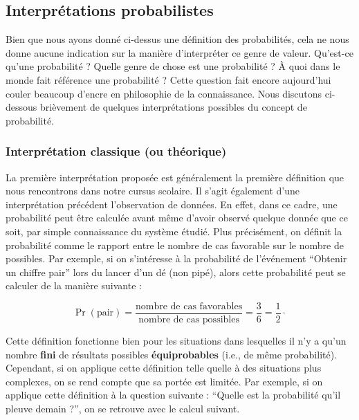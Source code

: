 \documentclass[
  a4paper,11pt,twoside,onecolumn,openright,final,oldfontcommands]{memoir}
\theoremstyle{definition}
\theoremstyle{definition}
\theoremstyle{definition}
\theoremstyle{remark}
\begin{document}
\hypertarget{interpruxe9tations-probabilistes}{%
\subsection{Interprétations probabilistes}\label{interpruxe9tations-probabilistes}}

Bien que nous ayons donné ci-dessus une définition des probabilités, cela ne nous donne aucune indication sur la manière d'interpréter ce genre de valeur. Qu'est-ce qu'une probabilité ? Quelle genre de chose est une probabilité ? À quoi dans le monde fait référence une probabilité ? Cette question fait encore aujourd'hui couler beaucoup d'encre en philosophie de la connaissance. Nous discutons ci-dessous brièvement de quelques interprétations possibles du concept de probabilité.

\hypertarget{interpruxe9tation-classique-ou-thuxe9orique}{%
\subsubsection{Interprétation classique (ou théorique)}\label{interpruxe9tation-classique-ou-thuxe9orique}}

La première interprétation proposée est généralement la première définition que nous rencontrons dans notre cursus scolaire. Il s'agit également d'une interprétation précédent l'observation de données. En effet, dans ce cadre, une probabilité peut être calculée avant même d'avoir observé quelque donnée que ce soit, par simple connaissance du système étudié. Plus précisément, on définit la probabilité comme le rapport entre le nombre de cas favorable sur le nombre de possibles. Par exemple, si on s'intéresse à la probabilité de l'événement ``Obtenir un chiffre pair'' lors du lancer d'un dé (non pipé), alors cette probabilité peut se calculer de la manière suivante :

\[
\Pr(\text{pair}) = \frac{\text{nombre de cas favorables}}{\text{nombre de cas possibles}} = \frac{3}{6} = \frac{1}{2} \cdot
\]

Cette définition fonctionne bien pour les situations dans lesquelles il n'y a qu'un nombre \textbf{fini} de résultats possibles \textbf{équiprobables} (i.e., de même probabilité). Cependant, si on applique cette définition telle quelle à des situations plus complexes, on se rend compte que sa portée est limitée. Par exemple, si on applique cette définition à la question suivante : ``Quelle est la probabilité qu'il pleuve demain ?'', on se retrouve avec le calcul suivant.
\end{document}
